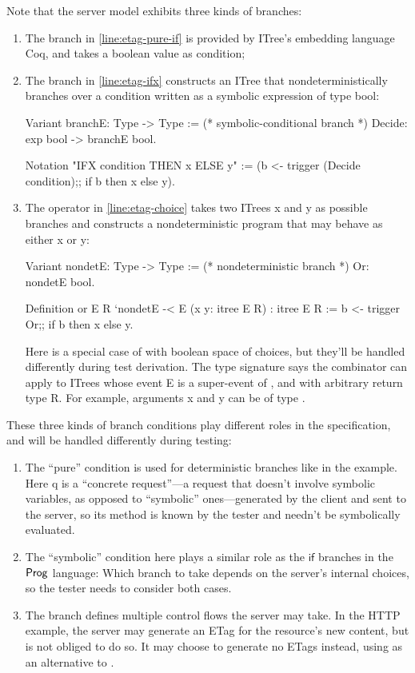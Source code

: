 Note that the server model exhibits three kinds of branches:
\begin{enumerate}
\item The  branch in \autoref{line:etag-pure-if} is provided by ITree's
embedding language Coq, and takes a boolean value as condition;
\item The  branch in \autoref{line:etag-ifx} constructs an ITree that
nondeterministically branches over a condition written as a symbolic expression
of type bool:
\begin{coq}
  Variant branchE: Type -> Type := (* symbolic-conditional branch *)
    Decide: exp bool -> branchE bool.

  Notation "IFX condition THEN x ELSE y" :=
    (b <- trigger (Decide condition);;
     if b then x else y).
\end{coq}
\item The  operator in \autoref{line:etag-choice} takes two ITrees
\ilc x and \ilc y as possible branches and constructs a nondeterministic program
that may behave as either \ilc x or \ilc y:
\begin{coq}
  Variant nondetE: Type -> Type := (* nondeterministic branch *)
    Or: nondetE bool.

  Definition or {E R} `{nondetE -< E} (x y: itree E R) : itree E R :=
    b <- trigger Or;;
    if b then x else y.
\end{coq}
Here  is a special case of  with boolean space of
choices, but they'll be handled differently during test derivation.  The type
signature  says the  combinator can
apply to ITrees whose event \ilc E is a super-event of , and with
arbitrary return type \ilc R.  For example, arguments \ilc x and \ilc y can be
of type .
\end{enumerate}

These three kinds of branch conditions play different roles in the
specification, and will be handled differently during testing:
\begin{enumerate}
\item The ``pure''  condition is used for deterministic branches like
   in the example.  Here \ilc q is a ``concrete
  request''---a request that doesn't involve symbolic variables, as opposed to
  ``symbolic'' ones---generated by the client and sent to the server, so its
  method is known by the tester and needn't be symbolically evaluated.
\item The ``symbolic''  condition here plays a similar role as the
  $\mathsf{if}$ branches in the $\mathsf{Prog}$ language: Which branch to take depends
  on the server's internal choices, so the tester needs to consider both cases.
\item The  branch defines multiple control flows the server may take.
  In the HTTP example, the server may generate an ETag for the resource's new
  content, but is not obliged to do so.  It may choose to generate no ETags
  instead, using  as an alternative
  to .
\end{enumerate}

